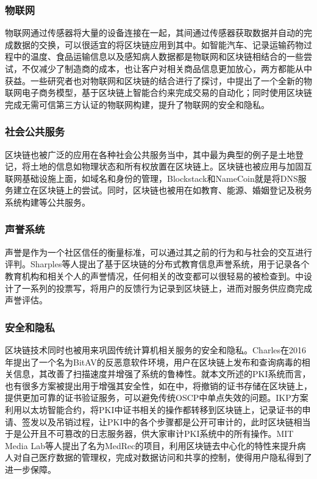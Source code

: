 \subsubsection{物联网}

物联网通过传感器将大量的设备连接在一起，其间通过传感器获取数据并自动的完成数据的交换，可以很适宜的将区块链应用到其中。如智能汽车、记录运输药物过程中的温度\cite{bocek2017blockchains}、食品运输信息\cite{schneider2017design}以及感知病人数据都是物联网和区块链相结合的一些尝试，不仅减少了制造商的成本，也让客户对相关商品信息更加放心，两方都能从中获益。一些研究者也对物联网和区块链的结合进行了探讨，\parencite{hardjono2016cloud}中提出了一个全新的物联网电子商务模型，基于区块链上智能合约来完成交易的自动化；同时使用区块链完成无需可信第三方认证的物联网构建，提升了物联网的安全和隐私。


\subsubsection{社会公共服务}

区块链也被广泛的应用在各种社会公共服务当中，其中最为典型的例子是土地登记，将土地的信息如物理状态和所有权放置在区块链上\cite{survey2015blockchain}。区块链也被应用与加固互联网基础设施上面，如域名和身份的管理，Blockstack\cite{ali2016blockstack}和NameCoin\cite{loibl2014namecoin}就是将DNS服务建立在区块链上的尝试。同时，区块链也被用在如教育、能源、婚姻登记及税务系统构建\cite{akins2014whole}等公共服务。

\subsubsection{声誉系统}

声誉是作为一个社区信任的衡量标准，可以通过其之前的行为和与社会的交互进行评判。Sharples等人提出了基于区块链的分布式教育信息声誉系统\cite{sharples2016blockchain}，用于记录各个教育机构和相关个人的声誉情况，任何相关的改变都可以很轻易的被检查到。\parencite{carboni2015feedback}中设计了一系列的投票写，将用户的反馈行为记录到区块链上，进而对服务供应商完成声誉评估。


\subsubsection{安全和隐私}

区块链技术同时也被用来巩固传统计算机相关服务的安全和隐私。Charles在2016年提出了一个名为BitAV的反恶意软件环境，用户在区块链上发布和查询病毒的相关信息，其改善了扫描速度并增强了系统的鲁棒性。就本文所述的PKI系统而言，也有很多方案被提出用于增强其安全性，如在\parencite{baldi2017certificate}中，将撤销的证书存储在区块链上，提供更加可靠的证书验证服务，可以避免传统OSCP中单点失效的问题。IKP\cite{matsumoto2016ikp}方案利用以太坊智能合约，将PKI中证书相关的操作都转移到区块链上，记录证书的申请、签发以及吊销过程，让PKI中的各个步骤都是公开可审计的，此时区块链相当于是公开且不可篡改的日志服务器，供大家审计PKI系统中的所有操作。MIT Media Lab等人提出了名为MedRec\cite{azaria2016medrec}的项目，利用区块链去中心化的特性来提升病人对自己医疗数据的管理权，完成对数据访问和共享的控制，使得用户隐私得到了进一步保障。




